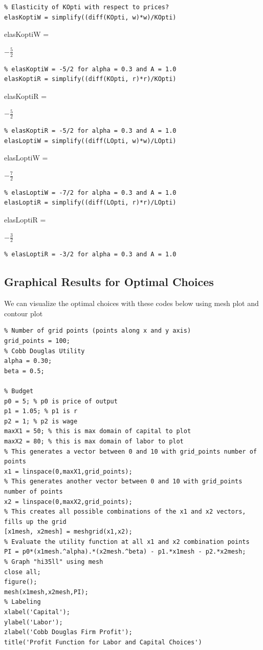 \documentclass[
]{book}
\begin{document}
\begin{verbatim}
% Elasticity of KOpti with respect to prices?
elasKoptiW = simplify((diff(KOpti, w)*w)/KOpti)
\end{verbatim}

elasKoptiW =

\(\displaystyle -\frac{5}{2}\)

\begin{verbatim}
% elasKoptiW = -5/2 for alpha = 0.3 and A = 1.0
elasKoptiR = simplify((diff(KOpti, r)*r)/KOpti)
\end{verbatim}

elasKoptiR =

\(\displaystyle -\frac{5}{2}\)

\begin{verbatim}
% elasKoptiR = -5/2 for alpha = 0.3 and A = 1.0
elasLoptiW = simplify((diff(LOpti, w)*w)/LOpti)
\end{verbatim}

elasLoptiW =

\(\displaystyle -\frac{7}{2}\)

\begin{verbatim}
% elasLoptiW = -7/2 for alpha = 0.3 and A = 1.0
elasLoptiR = simplify((diff(LOpti, r)*r)/LOpti)
\end{verbatim}

elasLoptiR =

\(\displaystyle -\frac{3}{2}\)

\begin{verbatim}
% elasLoptiR = -3/2 for alpha = 0.3 and A = 1.0
\end{verbatim}

\hypertarget{graphical-results-for-optimal-choices}{%
\subsection{Graphical Results for Optimal Choices}\label{graphical-results-for-optimal-choices}}

We can visualize the optimal choices with these codes below using mesh
plot and contour plot

\begin{verbatim}
% Number of grid points (points along x and y axis)
grid_points = 100;
% Cobb Douglas Utility
alpha = 0.30;
beta = 0.5;

% Budget
p0 = 5; % p0 is price of output
p1 = 1.05; % p1 is r
p2 = 1; % p2 is wage
maxX1 = 50; % this is max domain of capital to plot
maxX2 = 80; % this is max domain of labor to plot
% This generates a vector between 0 and 10 with grid_points number of points
x1 = linspace(0,maxX1,grid_points);
% This generates another vector between 0 and 10 with grid_points number of points
x2 = linspace(0,maxX2,grid_points);
% This creates all possible combinations of the x1 and x2 vectors, fills up the grid
[x1mesh, x2mesh] = meshgrid(x1,x2);
% Evaluate the utility function at all x1 and x2 combination points
PI = p0*(x1mesh.^alpha).*(x2mesh.^beta) - p1.*x1mesh - p2.*x2mesh;
% Graph "hi35ll" using mesh
close all;
figure();
mesh(x1mesh,x2mesh,PI);
% Labeling
xlabel('Capital');
ylabel('Labor');
zlabel('Cobb Douglas Firm Profit');
title('Profit Function for Labor and Capital Choices')
\end{verbatim}
\end{document}
